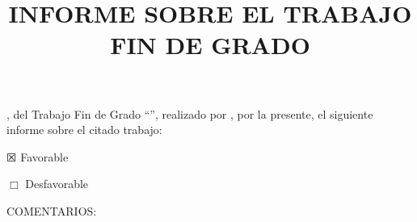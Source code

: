 

                             
   
 


\title{INFORME \MakeUppercase{\mybookDelOrDeLos{} \mybookTutorOrTutores}
  SOBRE EL TRABAJO FIN DE GRADO} 
                                                  
\date{}                                         
                               

{\Large
\maketitle 

\thispagestyle{empty}

\vspace{1cm}

\mybookadvisorsConDon, \mybookTutorOrTutores{} del Trabajo Fin de Grado
``\mybooktitle'', realizado por \donOrDonaAutor{} \mybookauthor, por la
presente, \mybookEmiteOrEmiten{} el siguiente informe sobre el citado
trabajo:

\vspace{1cm}

$\XBox$ Favorable

\vspace{0.5cm}

$\Box$ Desfavorable

\vspace{1cm}

COMENTARIOS:

\vspace{2cm}


\vspace{4cm}


}


